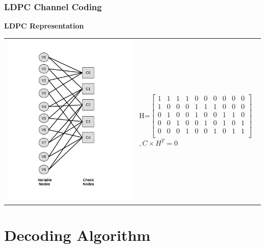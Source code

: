 \documentclass{beamer}
\begin{document}
\begin{frame}
	\frametitle{LDPC Channel Coding}
	\textbf{LDPC Representation}

{\small
\begin{tabular}{p{3cm} l}
\includegraphics[keepaspectratio=true,width=.35\paperwidth,valign=c]{img/tanner.pdf}&
H=$\begin{bmatrix}
    1 & 1 & 1 & 1 & 0 &0 &0 &0 &0 &0 \\
    1 & 0 & 0 & 0 & 1 &1 &1 &0 &0 &0 \\
    0 & 1 & 0 & 0 & 1 &0 &0 &1 &1 &0 \\
    0 & 0 & 1 & 0 & 0 &1 &0 &1 &0 &1 \\
    0 & 0 & 0 & 1 & 0 &0 &1 &0 &1 &1 \\
  \end{bmatrix}$
  $, C\times H^{T}=0$ \end{tabular}}
\end{frame}

\section{Decoding Algorithm}
\end{document}
